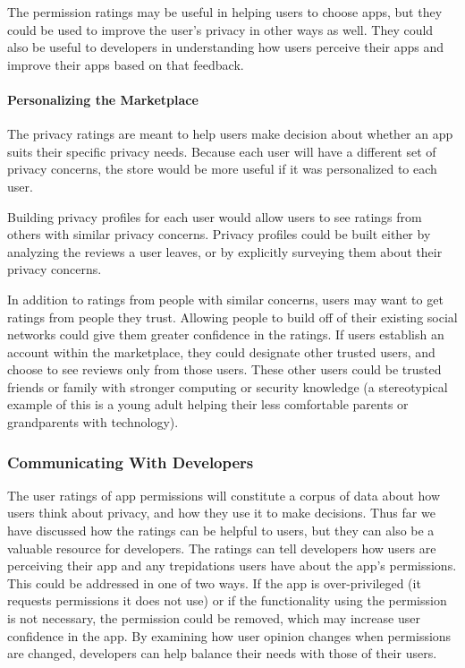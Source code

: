 \documentclass[11pt]{article}
\begin{document}
The permission ratings may be useful in helping users to choose apps, but
they could be used to improve the user's privacy in other ways as well. They could
also be useful to developers in understanding how users perceive their apps 
and improve their apps based on that feedback.

\paragraph{Personalizing the Marketplace}
\label{subsubsec-personalizing}

The privacy ratings are meant to help users make decision about whether
an app suits their specific privacy needs. Because each user will have a different
set of privacy concerns, the store would be more useful if it was personalized
to each user.

Building privacy profiles for each user would allow users to see ratings from
others with similar privacy concerns. Privacy profiles could be built either by 
analyzing the reviews a user leaves, or by explicitly surveying them about their
privacy concerns. 

In addition to ratings from people with similar concerns, users may want to get
ratings from people they trust. Allowing people to build off of their existing 
social networks could give them greater confidence in the ratings. If users 
establish an account within the marketplace, they could designate other trusted
users, and choose to see reviews only from those users.
These other users could be trusted friends or family with stronger
computing or security knowledge (a stereotypical example of this is a
young adult helping their less comfortable parents or grandparents with technology).


\subsubsection{Communicating With Developers}
\label{subsubsec-dev-comm}

The user ratings of app permissions will constitute a corpus of 
data about how users think about privacy, and how they use it to make decisions.
Thus far we have discussed how the ratings can be helpful to users, but
they can also be a valuable resource for developers. The ratings can tell
developers how users are perceiving their app and any trepidations users
have about the app's permissions. This could be addressed in one of two 
ways. If the app is over-privileged (it requests permissions it does not
use) or if the functionality using the permission is not necessary, the
permission could be removed, which may increase user confidence in the 
app. By examining how user opinion changes when permissions are changed,
developers can help balance their needs with those of their users. 
\end{document}
